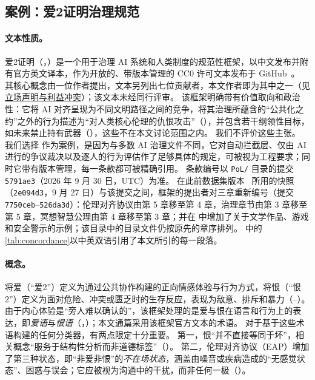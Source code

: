 \subsection{案例：爱2证明治理规范}
\label{sec:pol2}

\paragraph{文本性质。}
爱2证明（\pol{}，）是一个用于治理 AI 系统和人类制度的规范性框架，以中文发布并附有官方英文译本，作为开放的、带版本管理的 CC0 许可文本发布于 GitHub~\cite{pol2text,pol2en}。
其核心概念由一位作者提出，文本另列出七位贡献者，本文作者即为其中之一（见\hyperref[sec:statements]{立场声明与利益冲突}）；该文本未经同行评审。
该框架明确带有价值取向和政治性：它将 AI 对齐呈现为不同文明路径之间的竞争，将其治理所蕴含的“公共化之约”之外的行为描述为“对人类核心伦理的仇恨攻击”（），并包含若干纲领性目标，如未来禁止持有武器（），这些不在本文讨论范围之内。
我们不评价这些主张。
我们选择 \pol{} 作为案例，是因为与多数 AI 治理文件不同，它对自动拦截层、仅由 AI 进行的争议裁决以及逐人的行为评估作了足够具体的规定，可被视为工程要求；同时它带有版本管理，每一条款都可被精确引用。
条款编号以 \texttt{PoL/} 目录的提交 \texttt{5791ae3}（2026 年 9 月 30 日，UTC）为准。
在此前数据集版本~\cite{survey01} 所用的快照（\texttt{2e094d3}，9 月 27 日）与该提交之间，框架的提出者对三章重新编号（提交 \texttt{7750ceb}--\texttt{526da3d}）：伦理对齐协议由第 5 章移至第 4 章，治理章节由第 3 章移至第 5 章，冥想智慧公理由第 4 章移至第 3 章；并在  中增加了关于文学作品、游戏和安全警示的示例；该目录中的目录文件仍按原先的章序排列。
 中的\cref{tab:concordance}以中英双语引用了本文所引的每一段落。

\paragraph{概念。}
\pol{} 将爱（“爱2”）定义为通过公共协作构建的正向情感体验与行为方式，将恨（“恨2”）定义为面对危险、冲突或匮乏时的生存反应，表现为敌意、排斥和暴力（--）。
由于内心体验是“旁人难以确认的”，该框架处理的是爱与恨在语言和行为上的表达，即\emph{爱语}与\emph{恨语}（，）；本文通篇采用该框架官方文本的术语。
对于基于这些术语构建的任何分类器，有两点限定十分重要。
第一，恨“并不直接等同于坏”，相关概念“服务于结构性分析而非道德标签”（）。
第二，伦理对齐协议（EAP）增加了第三种状态，即“非爱非恨”的\emph{不在场状态}，涵盖由噪音或疾病造成的“无感觉状态”、困惑与误会；它应被视为沟通中的干扰，而非任何一极（）。

